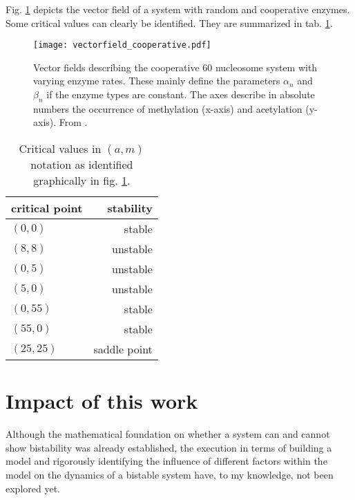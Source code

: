             Fig. \ref{img:cooperativeVectorField} depicts the vector field of a system with random and cooperative enzymes. Some critical values can clearly be identified. They are summarized in tab. \ref{tab:cooperativeCriticalValues}.

            \begin{figure}[htbp!]
                \centering
                \texttt{[image: vectorfield\_cooperative.pdf]}
                \caption{Vector fields describing the cooperative 60 nucleosome system with varying enzyme rates. These mainly define the parameters $\alpha_n$ and $\beta_n$ if the enzyme types are constant. The axes describe in absolute numbers the occurrence of methylation (x-axis) and acetylation (y-axis). From \cite{mayer2020langevin}.}
                \label{img:cooperativeVectorField}
            \end{figure}

            \begin{table}[htbp!]
                \caption{Critical values in $(a,m)$ notation as identified graphically in fig. \ref{img:cooperativeVectorField}.}
                \begin{center}
                    \begin{tabular}{l r}
                        \hline
                        \textbf{critical point} & \textbf{stability} \\
                        \hline
                        $(0,0)$     & stable \\
                        $(8,8)$     & unstable \\
                        $(0,5)$     & unstable \\
                        $(5,0)$     & unstable \\
                        $(0,55)$    & stable \\
                        $(55,0)$    & stable \\
                        $(25,25)$   & saddle point \\
                        \hline
                    \end{tabular}
                \end{center}
                \label{tab:cooperativeCriticalValues}
            \end{table}
    \section{Impact of this work}
        Although the mathematical foundation on whether a system can and cannot show bistability was already established, the execution in terms of building a model and rigorously identifying the influence of different factors within the model on the dynamics of a bistable system have, to my knowledge, not been explored yet.

